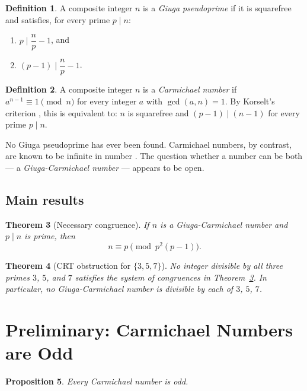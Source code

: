 \documentclass[12pt,a4paper]{amsart}
\newtheorem{theorem}{Theorem}[section]
\newtheorem{proposition}[theorem]{Proposition}
\theoremstyle{definition}
\newtheorem{definition}[theorem]{Definition}
\begin{document}
\begin{definition}
A composite integer $n$ is a \emph{Giuga pseudoprime} if it is squarefree
and satisfies, for every prime $p \mid n$:
\begin{enumerate}
  \item[(W)] $p \mid \dfrac{n}{p} - 1$, \quad and
  \item[(S)] $(p-1) \mid \dfrac{n}{p} - 1$.
\end{enumerate}
\end{definition}

\begin{definition}
A composite integer $n$ is a \emph{Carmichael number} if
$a^{n-1} \equiv 1 \pmod{n}$ for every integer $a$ with $\gcd(a, n) = 1$.
By Korselt's criterion \cite{Korselt1899}, this is equivalent to:
$n$ is squarefree and $(p-1) \mid (n-1)$ for every prime $p \mid n$.
\end{definition}

No Giuga pseudoprime has ever been found.  Carmichael numbers, by contrast,
are known to be infinite in number \cite{Alford1994}.  The question whether
a number can be both — a \emph{Giuga-Carmichael number} — appears to be open.

\subsection{Main results}

\begin{theorem}[Necessary congruence]
\label{thm:congruence}
If $n$ is a Giuga-Carmichael number and $p \mid n$ is prime, then
\[
  n \equiv p \pmod{p^2(p-1)}.
\]
\end{theorem}

\begin{theorem}[CRT obstruction for $\{3, 5, 7\}$]
\label{thm:crt357}
No integer divisible by all three primes $3$, $5$, and $7$ satisfies
the system of congruences in Theorem~\ref{thm:congruence}.
In particular, no Giuga-Carmichael number is divisible by each of $3$, $5$, $7$.
\end{theorem}

\section{Preliminary: Carmichael Numbers are Odd}
\label{sec:odd}

\begin{proposition}
\label{prop:odd}
Every Carmichael number is odd.
\end{proposition}
\end{document}
